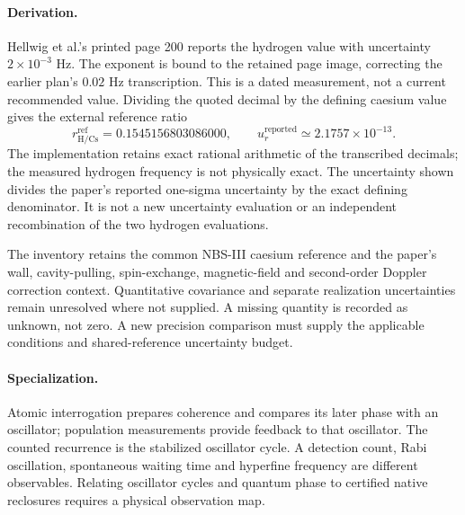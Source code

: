 \paragraph{Derivation.}
Hellwig et al.'s printed page 200 reports the hydrogen value with uncertainty \(2\times10^{-3}\) Hz. The exponent is bound to the retained page image, correcting the earlier plan's \(0.02\) Hz transcription. This is a dated measurement, not a current recommended value. Dividing the quoted decimal by the defining caesium value gives the external reference ratio
\[
r_{\mathrm{H/Cs}}^{\mathrm{ref}}=0.1545156803086000,
\qquad
u_r^{\mathrm{reported}}\simeq2.1757\times10^{-13}.
\]
The implementation retains exact rational arithmetic of the transcribed decimals; the measured hydrogen frequency is not physically exact. The uncertainty shown divides the paper's reported one-sigma uncertainty by the exact defining denominator. It is not a new uncertainty evaluation or an independent recombination of the two hydrogen evaluations.

The inventory retains the common NBS-III caesium reference and the paper's wall, cavity-pulling, spin-exchange, magnetic-field and second-order Doppler correction context. Quantitative covariance and separate realization uncertainties remain unresolved where not supplied. A missing quantity is recorded as unknown, not zero. A new precision comparison must supply the applicable conditions and shared-reference uncertainty budget.

\paragraph{Specialization.}
Atomic interrogation prepares coherence and compares its later phase with an oscillator; population measurements provide feedback to that oscillator. The counted recurrence is the stabilized oscillator cycle. A detection count, Rabi oscillation, spontaneous waiting time and hyperfine frequency are different observables. Relating oscillator cycles and quantum phase to certified native reclosures requires a physical observation map.


